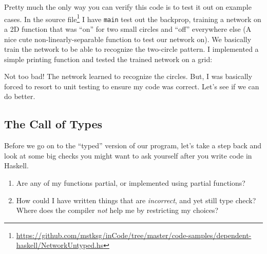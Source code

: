\documentclass[]{article}
\newenvironment{Shaded}{}{}
\newcommand{\KeywordTok}[1]{\textcolor[rgb]{0.00,0.44,0.13}{\textbf{{#1}}}}
\newcommand{\CommentTok}[1]{\textcolor[rgb]{0.38,0.63,0.69}{\textit{{#1}}}}
\newcommand{\NormalTok}[1]{{#1}}
\renewcommand{\href}[2]{#2\footnote{\url{#1}}}
\begin{document}
Pretty much the only way you can verify this code is to test it out on
example cases. In the
\href{https://github.com/mstksg/inCode/tree/master/code-samples/dependent-haskell/NetworkUntyped.hs}{source
file} I have \texttt{main} test out the backprop, training a network on
a 2D function that was ``on'' for two small circles and ``off''
everywhere else (A nice cute non-linearly-separable function to test our
network on). We basically train the network to be able to recognize the
two-circle pattern. I implemented a simple printing function and tested
the trained network on a grid:

\begin{Shaded}
\end{Shaded}

Not too bad! The network learned to recognize the circles. But, I was
basically forced to resort to unit testing to ensure my code was
correct. Let's see if we can do better.

\subsection{The Call of Types}\label{the-call-of-types}

Before we go on to the ``typed'' version of our program, let's take a
step back and look at some big checks you might want to ask yourself
after you write code in Haskell.

\begin{enumerate}
\def\labelenumi{\arabic{enumi}.}
\tightlist
\item
  Are any of my functions partial, or implemented using partial
  functions?
\item
  How could I have written things that are \emph{incorrect}, and yet
  still type check? Where does the compiler \emph{not} help me by
  restricting my choices?
\end{enumerate}
\end{document}
